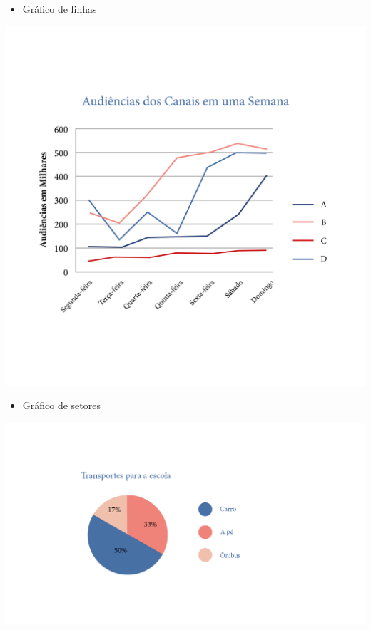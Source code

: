 {\begin{itemize}
\item
  Gráfico de linhas
\end{itemize}

\includegraphics[width=\textwidth]{../ilustracoes/MAT5/SAEB_5ANO_MAT_figura59.png}

\begin{itemize}
\item
  Gráfico de setores
\end{itemize}

\includegraphics[width=\textwidth]{../ilustracoes/MAT5/SAEB_5ANO_MAT_figura60.png}
}

